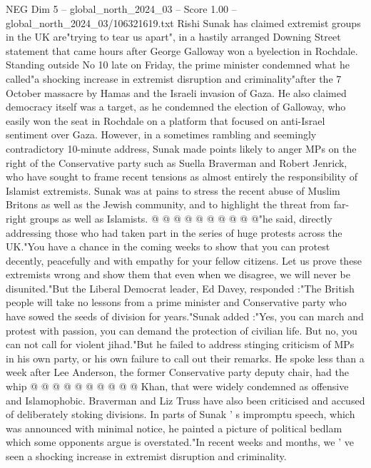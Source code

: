 \begin{textsample}{NEG Dim 5 – global\_north\_2024\_03 – Score 1.00 – global\_north\_2024\_03/106321619.txt}  \label{ex:f5_neg_086}
Rishi Sunak has claimed extremist groups in the UK are"trying to tear us apart", in a hastily arranged Downing Street statement that came hours after George Galloway won a byelection in Rochdale.
Standing outside No 10 late on Friday, the prime minister condemned what he called"a shocking increase in extremist disruption and criminality"after the 7 October massacre by Hamas and the Israeli invasion of Gaza.
He also claimed democracy itself was a target, as he condemned the election of Galloway, who easily won the seat in Rochdale on a platform that focused on anti-Israel sentiment over Gaza.
However, in a sometimes rambling and seemingly contradictory 10-minute address, Sunak made points likely to anger MPs on the right of the Conservative party such as Suella Braverman and Robert Jenrick, who have sought to frame recent tensions as almost entirely the responsibility of Islamist extremists.
Sunak was at pains to stress the recent abuse of Muslim Britons as well as the Jewish community, and to highlight the threat from far-right groups as well as Islamists. @ @ @ @ @ @ @ @ @ @"he said, directly addressing those who had taken part in the series of huge protests across the UK."You have a chance in the coming weeks to show that you can protest decently, peacefully and with empathy for your fellow citizens.
Let us prove these extremists wrong and show them that even when we disagree, we will never be disunited."But the Liberal Democrat leader, Ed Davey, responded :"The British people will take no lessons from a prime minister and Conservative party who have sowed the seeds of division for years."Sunak added :"Yes, you can march and protest with passion, you can demand the protection of civilian life.
But no, you can not call for violent jihad."But he failed to address stinging criticism of MPs in his own party, or his own failure to call out their remarks.
He spoke less than a week after Lee Anderson, the former Conservative party deputy chair, had the whip @ @ @ @ @ @ @ @ @ @ Khan, that were widely condemned as offensive and Islamophobic.
Braverman and Liz Truss have also been criticised and accused of deliberately stoking divisions.
In parts of Sunak ' s impromptu speech, which was announced with minimal notice, he painted a picture of political bedlam which some opponents argue is overstated."In recent weeks and months, we ' ve seen a shocking increase in extremist disruption and criminality.

\end{textsample}
